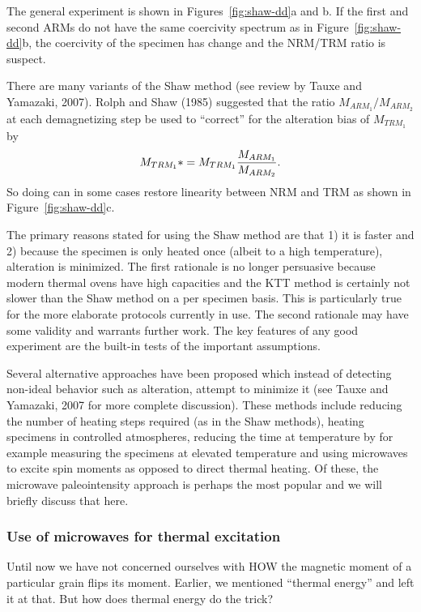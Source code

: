 The general experiment is shown in Figures~\ref{fig:shaw-dd}a and b.  If the first and second ARMs do not have the same coercivity spectrum as in Figure~\ref{fig:shaw-dd}b, the coercivity of the specimen has change and the NRM/TRM ratio is suspect.  

There are many variants of the Shaw method (see review by 
Tauxe and Yamazaki, 2007).
  Rolph and Shaw (1985) \nocite{rolph85}
suggested that the ratio $M_{ARM_1}/M_{ARM_2}$ at each demagnetizing step be used to ``correct'' for the alteration bias of $M_{TRM_1}$ by
$$
{M_{TRM_1}*} ={M_{TRM_1}}{ { M_{ARM_1}}\over {M_{ARM_2}}}. 
$$
\noindent So doing can in some cases restore linearity between NRM and TRM as shown in Figure~\ref{fig:shaw-dd}c.   
 
  The primary reasons stated for using the Shaw method are  that 1) it is faster and 2) because the specimen is only heated once (albeit to a high temperature), alteration is minimized.    The first rationale is no longer persuasive because modern thermal ovens have high capacities  and the KTT method is certainly not slower than the Shaw method on a per specimen basis.  This is particularly true for the more elaborate protocols currently in use.      The second rationale may have  some validity and warrants further work.  The key features of any good experiment are the built-in tests of the important assumptions.   
  

 
  Several alternative approaches have been proposed which instead of detecting non-ideal behavior such as alteration, attempt to minimize it (see
 Tauxe and Yamazaki, 2007 for more complete discussion).  These methods include reducing the number of heating steps required (as in the Shaw methods), heating specimens in controlled atmospheres, reducing the time at temperature by for example measuring the specimens at elevated temperature  and using microwaves to excite spin moments as opposed to direct thermal heating.     Of these, the microwave paleointensity approach is perhaps the most popular and we will briefly discuss that here.  

 
\subsubsection{Use of microwaves for thermal excitation}

Until now we have not concerned ourselves with HOW the magnetic moment of a particular grain flips its moment.  Earlier, we mentioned ``thermal energy'' and left it at that. But how does thermal energy do the trick?  

